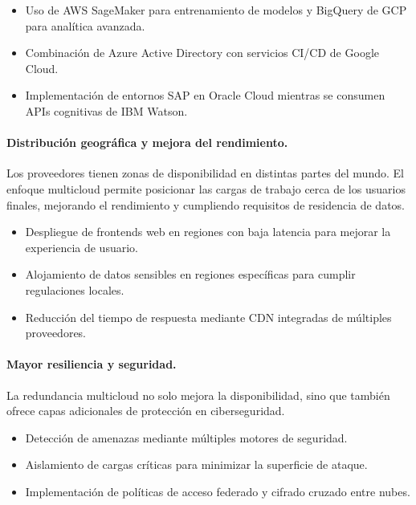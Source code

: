{            \begin{itemize}
                \item Uso de AWS SageMaker para entrenamiento de modelos y BigQuery de GCP para analítica avanzada.
                \item Combinación de Azure Active Directory con servicios CI/CD de Google Cloud.
                \item Implementación de entornos SAP en Oracle Cloud mientras se consumen APIs cognitivas de IBM Watson.
            \end{itemize}
            
            \paragraph{Distribución geográfica y mejora del rendimiento.}
            Los proveedores tienen zonas de disponibilidad en distintas partes del mundo. El enfoque multicloud permite posicionar las cargas de trabajo cerca de los usuarios finales, mejorando el rendimiento y cumpliendo requisitos de residencia de datos.
            
            \begin{itemize}
                \item Despliegue de frontends web en regiones con baja latencia para mejorar la experiencia de usuario.
                \item Alojamiento de datos sensibles en regiones específicas para cumplir regulaciones locales.
                \item Reducción del tiempo de respuesta mediante CDN integradas de múltiples proveedores.
            \end{itemize}
            
            \paragraph{Mayor resiliencia y seguridad.}
            La redundancia multicloud no solo mejora la disponibilidad, sino que también ofrece capas adicionales de protección en ciberseguridad.
            
            \begin{itemize}
                \item Detección de amenazas mediante múltiples motores de seguridad.
                \item Aislamiento de cargas críticas para minimizar la superficie de ataque.
                \item Implementación de políticas de acceso federado y cifrado cruzado entre nubes.
            \end{itemize}
            
}
